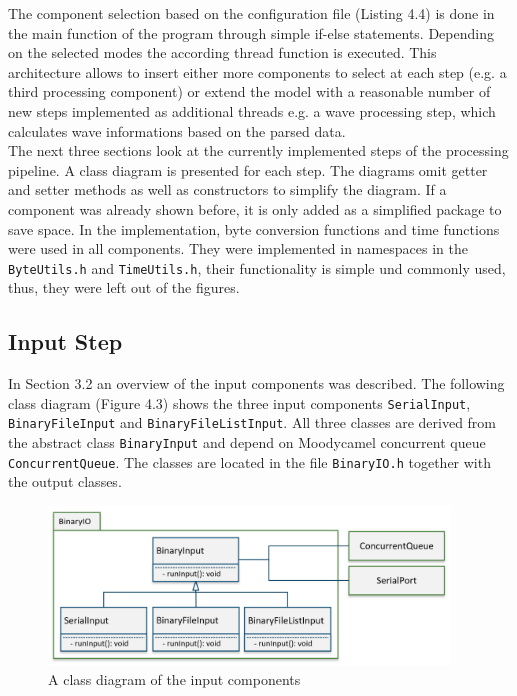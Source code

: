 The component selection based on the configuration file (Listing 4.4) is done in the main function of the program through simple if-else statements. Depending on the selected modes the according thread function is executed. This architecture allows to insert either more components to select at each step (e.g. a third processing component) or extend the model with a reasonable number of new steps implemented as additional threads e.g. a wave processing step, which calculates wave informations based on the parsed data. \\

The next three sections look at the currently implemented steps of the processing pipeline. A class diagram is presented for each step. The diagrams omit getter and setter methods as well as constructors to simplify the diagram. If a component was already shown before, it is only added as a simplified package to save space. In the implementation, byte conversion functions and time functions were used in all components. They were implemented in namespaces in the \texttt{ByteUtils.h} and \texttt{TimeUtils.h}, their functionality is simple und commonly used, thus, they were left out of the figures.
\subsection{Input Step}
In Section 3.2 an overview of the input components was described. The following class diagram (Figure 4.3) shows the three input components \texttt{SerialInput}, \texttt{BinaryFileInput} and \texttt{BinaryFileListInput}. All three classes are derived from the abstract class \texttt{BinaryInput} and depend on Moodycamel concurrent queue \texttt{ConcurrentQueue}. The classes are located in the file \texttt{BinaryIO.h} together with the output classes.

\begin{figure}[ht]
\centering
      \includegraphics[width=0.95\textwidth]{input}
        \caption{A class diagram of the input components}
\end{figure}

